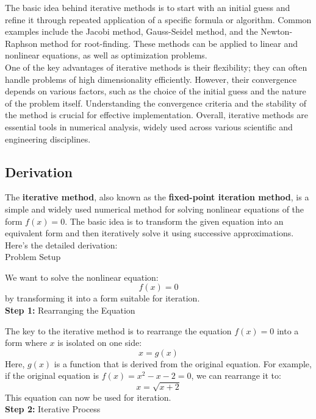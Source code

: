 \documentclass[12pt,a4paper]{article}
\begin{document}
	The basic idea behind iterative methods is to start with an initial guess and refine it through repeated application of a specific formula or algorithm. Common examples include the Jacobi method, Gauss-Seidel method, and the Newton-Raphson method for root-finding. These methods can be applied to linear and nonlinear equations, as well as optimization problems.\\
	
	One of the key advantages of iterative methods is their flexibility; they can often handle problems of high dimensionality efficiently. However, their convergence depends on various factors, such as the choice of the initial guess and the nature of the problem itself. Understanding the convergence criteria and the stability of the method is crucial for effective implementation. Overall, iterative methods are essential tools in numerical analysis, widely used across various scientific and engineering disciplines.
	
	\vspace{1cm}
	
	\subsection{Derivation}
	The \textbf{iterative method}, also known as the \textbf{fixed-point iteration method}, is a simple and widely used numerical method for solving nonlinear equations of the form \( f(x) = 0 \). The basic idea is to transform the given equation into an equivalent form and then iteratively solve it using successive approximations. Here’s the detailed derivation:\\
	
	Problem Setup
	
	We want to solve the nonlinear equation:
	\[
	f(x) = 0
	\]
	by transforming it into a form suitable for iteration.\\
	
	\textbf{Step 1:} Rearranging the Equation
	
	The key to the iterative method is to rearrange the equation \( f(x) = 0 \) into a form where \( x \) is isolated on one side:
	\[
	x = g(x)
	\]
	Here, \( g(x) \) is a function that is derived from the original equation. For example, if the original equation is \( f(x) = x^2 - x - 2 = 0 \), we can rearrange it to:
	\[
	x = \sqrt{x + 2}
	\]
	This equation can now be used for iteration.\\
	
	\textbf{Step 2:} Iterative Process
	
\end{document}
